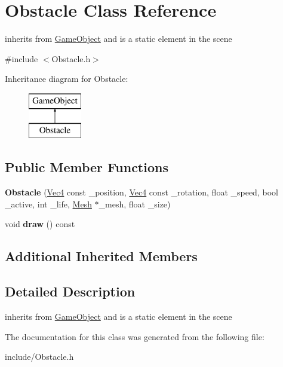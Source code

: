 \hypertarget{classObstacle}{}\section{Obstacle Class Reference}
\label{classObstacle}


inherits from \hyperlink{classGameObject}{Game\+Object} and is a static element in the scene  




{\ttfamily \#include $<$Obstacle.\+h$>$}

Inheritance diagram for Obstacle\+:\begin{figure}[H]
\begin{center}
\leavevmode
\includegraphics[height=2.000000cm]{classObstacle}
\end{center}
\end{figure}
\subsection*{Public Member Functions}
\begin{DoxyCompactItemize}
\item 
{\bfseries Obstacle} (\hyperlink{classVec4}{Vec4} const \+\_\+position, \hyperlink{classVec4}{Vec4} const \+\_\+rotation, float \+\_\+speed, bool \+\_\+active, int \+\_\+life, \hyperlink{classMesh}{Mesh} $\ast$\+\_\+mesh, float \+\_\+size)\hypertarget{classObstacle_a78a09081fd4ef17227497c4f1076f325}{}\label{classObstacle_a78a09081fd4ef17227497c4f1076f325}

\item 
void {\bfseries draw} () const \hypertarget{classObstacle_ac7e7e1ae0763fd7f60296999106a8615}{}\label{classObstacle_ac7e7e1ae0763fd7f60296999106a8615}

\end{DoxyCompactItemize}
\subsection*{Additional Inherited Members}


\subsection{Detailed Description}
inherits from \hyperlink{classGameObject}{Game\+Object} and is a static element in the scene 

The documentation for this class was generated from the following file\+:\begin{DoxyCompactItemize}
\item 
include/Obstacle.\+h\end{DoxyCompactItemize}
